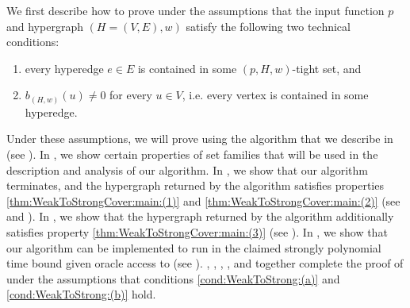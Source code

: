 We first describe how to prove  under the assumptions that the input function $p$ and hypergraph $\left(H = (V,E),w\right)$ satisfy the following two technical conditions:
\begin{enumerate}[label=(\alph*), ref=(\alph*)]
    \item \label{cond:WeakToStrong:(a)} %
    every hyperedge $e \in E$ is contained in some $(p, H, w)$-tight set, and
    \item \label{cond:WeakToStrong:(b)} $b_{(H,w)}(u) \not = 0$ for every $u \in V$, i.e. every vertex is contained in some hyperedge.
\end{enumerate}  
Under these assumptions, we will prove  using the algorithm that we describe in  (see ). In , we show certain properties of set families that will be used in the description and analysis of our algorithm. In , we show that our algorithm terminates, and the hypergraph returned by the algorithm satisfies properties \ref{thm:WeakToStrongCover:main:(1)} and \ref{thm:WeakToStrongCover:main:(2)} (see  and ). In , we show that the hypergraph returned by the algorithm additionally satisfies property \ref{thm:WeakToStrongCover:main:(3)} (see ). In , we show that our algorithm can be implemented to run in the claimed strongly polynomial time bound given oracle access to  (see ).
, , , , and  together complete the proof of  under the assumptions that conditions \ref{cond:WeakToStrong:(a)} and \ref{cond:WeakToStrong:(b)} hold.

